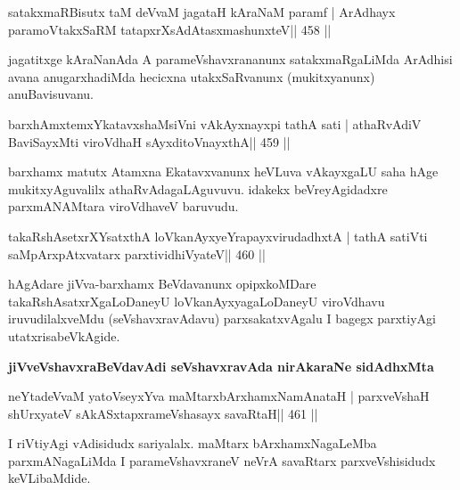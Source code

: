 \begin{shl}
satakxmaRBisutx taM deVvaM jagataH kAraNaM paramf |
ArAdhayx paramoVtakxSaRM tatapxrXsAdAtasxmashunxteV\hfill || 458 ||
\end{shl}

\begin{artha}
jagatitxge kAraNanAda A parameVshavxrananunx satakxmaRgaLiMda ArAdhisi
avana anugarxhadiMda hecicxna utakxSaRvanunx (mukitxyanunx) anuBavisuvanu.
\end{artha}


\begin{shl}
barxhAmxtemxYkatavxshaMsiVni vAkAyxnayxpi tathA sati |
athaRvAdiV BaviSayxMti viroVdhaH sAyxditoV\s nayxthA\hfill || 459 ||
\end{shl}

\begin{artha}
barxhamx matutx Atamxna Ekatavxvanunx heVLuva vAkayxgaLU saha hAge mukitxyAguvalilx athaRvAdagaLAguvuvu. idakekx beVreyAgidadxre parxmANAMtara viroVdhaveV baruvudu.
\end{artha}

\begin{shl}
takaRshAsetxrXYsatxthA loVkanAyxyeYrapayxvirudadhxtA |
tathA satiVti saMpArxpAtxvatarx parxtividhiVyateV\hfill || 460 ||
\end{shl}


\begin{artha}
hAgAdare jiVva-barxhamx BeVdavanunx opipxkoMDare
takaRshAsatxrXgaLoDaneyU 
loVkanAyxyagaLoDaneyU viroVdhavu iruvudilalxveMdu (seVshavxravAdavu)
parxsakatxvAgalu I bagegx parxtiyAgi utatxrisabeVkAgide.
\end{artha}

\medskip
\centerline{\textbf{jiVveVshavxraBeVdavAdi seVshavxravAda nirAkaraNe
sidAdhxMta}}
\medskip

\begin{shl}
neYtadeVvaM yatoV\s seyxYva maMtarxbArxhamxNamAnataH |
parxveVshaH shUrxyateV sAkASxtapxrameVshasayx savaRtaH\hfill || 461 ||
\end{shl}

\begin{artha}
I riVtiyAgi vAdisidudx sariyalalx. maMtarx bArxhamxNagaLeMba parxmANagaLiMda I parameVshavxraneV neVrA savaRtarx parxveVshisidudx keVLibaMdide.
\end{artha}


